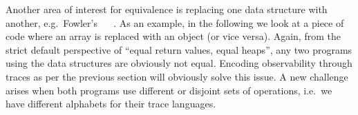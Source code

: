 Another area of interest for equivalence is replacing one data structure with another,
e.g.\ Fowler's ~\cite[p.186]{fowler:refactoring} ~\cite{fowler:refactoring2nd}.
As an example, in the following we look at a piece of code where an array is replaced with an object (or vice versa).
Again, from the strict default perspective of ``equal return values, equal heaps'', any two programs using the data structures are obviously not equal.
Encoding observability through traces as per the previous section will obviously solve this issue.
A new challenge arises when both programs use different or disjoint sets of operations, i.e.\ we have different alphabets for their trace languages.




